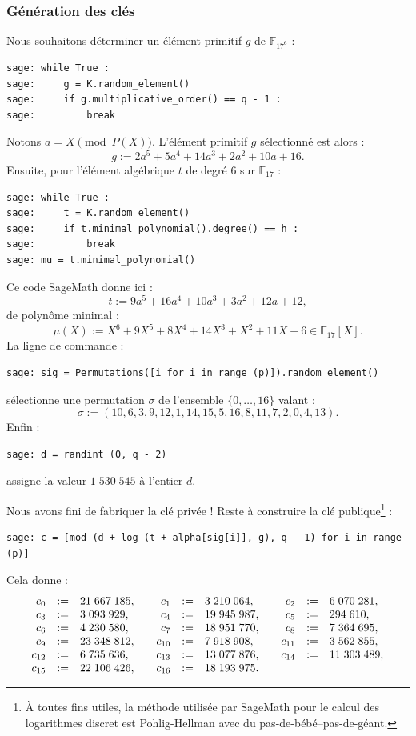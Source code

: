 \documentclass[a4paper, titlepage, 11pt]{article}
\theoremstyle{definition}
\theoremstyle{remark}
\def\gf #1{\mathbb{F}_{#1}}
\begin{document}
\subsubsection{Génération des clés}
Nous souhaitons déterminer un élément primitif $g$ de $\gf{17^6}$ :
\begin{verbatim}
sage: while True :
sage:     g = K.random_element()
sage:     if g.multiplicative_order() == q - 1 :
sage:         break
\end{verbatim}
Notons $a = X \pmod{P(X)}$. L'élément primitif $g$ sélectionné est alors :
$$g := 2a^5 + 5a^4 + 14a^3 + 2a^2 + 10a + 16.$$
Ensuite, pour l'élément algébrique $t$ de degré $6$ sur $\gf{17}$ :
\begin{verbatim}
sage: while True :
sage:     t = K.random_element()
sage:     if t.minimal_polynomial().degree() == h :
sage:         break
sage: mu = t.minimal_polynomial()
\end{verbatim}
Ce code SageMath donne ici :
$$t := 9a^5 + 16a^4 + 10a^3 + 3a^2 + 12a + 12,$$
de polynôme minimal :
$$\mu(X) := X^6 + 9X^5 + 8X^4 + 14X^3 + X^2 + 11X + 6\in\gf{17}[X].$$
La ligne de commande :
\begin{verbatim}
sage: sig = Permutations([i for i in range (p)]).random_element()
\end{verbatim}
sélectionne une permutation $\sigma$ de l'ensemble $\{0, \dots, 16\}$ valant :
$$\sigma := (10, 6, 3, 9, 12, 1, 14, 15, 5, 16, 8, 11, 7, 2, 0, 4, 13).$$
Enfin : 
\begin{verbatim}
sage: d = randint (0, q - 2)
\end{verbatim}
assigne la valeur $1\;530\;545$ à l'entier $d$.

Nous avons fini de fabriquer la clé privée ! Reste à construire la clé publique\footnote{À toutes fins utiles, la méthode utilisée par SageMath pour le calcul des logarithmes discret est Pohlig-Hellman \cite{pohligHellman1978} avec du pas-de-bébé--pas-de-géant.} :
\begin{verbatim}
sage: c = [mod (d + log (t + alpha[sig[i]], g), q - 1) for i in range (p)]
\end{verbatim}
Cela donne :
$$\begin{array}{r c l c r c l c r c l}
c_0 &:=& 21\;667\;185, &&
c_1 &:=& 3\;210\;064, &&
c_2 &:=& 6\;070\;281, \\
c_3 &:=& 3\;093\;929, &&
c_4 &:=& 19\;945\;987, &&
c_5 &:=& 294\;610, \\
c_6 &:=& 4\;230\;580, &&
c_7 &:=& 18\;951\;770, &&
c_8 &:=& 7\;364\;695, \\
c_9 &:=& 23\;348\;812, &&
c_{10} &:=& 7\;918\;908, &&
c_{11} &:=& 3\;562\;855, \\
c_{12} &:=& 6\;735\;636, &&
c_{13} &:=& 13\;077\;876, &&
c_{14} &:=& 11\;303\;489, \\
c_{15} &:=& 22\;106\;426, &&
c_{16} &:=& 18\;193\;975.
\end{array}$$
\end{document}
